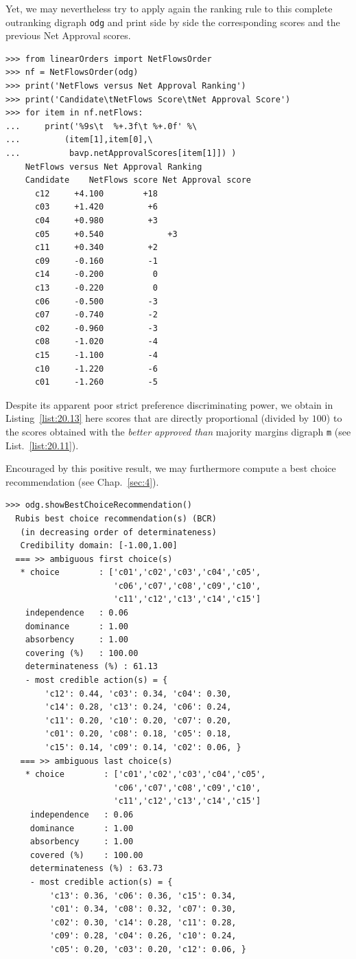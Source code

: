 Yet, we may nevertheless try to apply again the \NetFlows ranking rule to this complete outranking digraph \texttt{odg} and print side by side the corresponding \NetFlows scores and the previous Net Approval scores. 
\begin{lstlisting}[caption={Comparing the \NetFlows and the Net Approval rankings},label=list:20.13]
>>> from linearOrders import NetFlowsOrder
>>> nf = NetFlowsOrder(odg)
>>> print('NetFlows versus Net Approval Ranking')
>>> print('Candidate\tNetFlows Score\tNet Approval Score')
>>> for item in nf.netFlows:
...     print('%9s\t  %+.3f\t %+.0f' %\
...         (item[1],item[0],\
...          bavp.netApprovalScores[item[1]]) )  
    NetFlows versus Net Approval Ranking
    Candidate    NetFlows score	Net Approval score
      c12	  +4.100	    +18
      c03	  +1.420	     +6
      c04	  +0.980	     +3
      c05	  +0.540             +3
      c11	  +0.340	     +2
      c09	  -0.160	     -1
      c14	  -0.200	      0
      c13	  -0.220	      0
      c06	  -0.500	     -3
      c07	  -0.740	     -2
      c02	  -0.960	     -3
      c08	  -1.020	     -4
      c15	  -1.100	     -4
      c10	  -1.220	     -6
      c01	  -1.260	     -5
\end{lstlisting}

Despite its apparent poor strict preference discriminating power, we obtain in Listing~\vref{list:20.13} here \NetFlows scores that are directly proportional (divided by $100$) to the scores obtained with the \emph{better approved than} majority margins digraph \texttt{m} (see List.~\vref{list:20.11}).

Encouraged by this positive result, we may furthermore compute a \Rubis best choice recommendation (see Chap.~\ref{sec:4}).
\begin{lstlisting}[caption={Computing a best social choice recommendation},label=list:20.14]
>>> odg.showBestChoiceRecommendation()
  Rubis best choice recommendation(s) (BCR)
   (in decreasing order of determinateness)   
   Credibility domain: [-1.00,1.00]
  === >> ambiguous first choice(s) 
   * choice        : ['c01','c02','c03','c04','c05',
                      'c06','c07','c08','c09','c10',
                      'c11','c12','c13','c14','c15']
    independence   : 0.06
    dominance      : 1.00
    absorbency     : 1.00
    covering (%)   : 100.00
    determinateness (%) : 61.13
    - most credible action(s) = {
        'c12': 0.44, 'c03': 0.34, 'c04': 0.30,
        'c14': 0.28, 'c13': 0.24, 'c06': 0.24,
        'c11': 0.20, 'c10': 0.20, 'c07': 0.20,
        'c01': 0.20, 'c08': 0.18, 'c05': 0.18,
        'c15': 0.14, 'c09': 0.14, 'c02': 0.06, }
   === >> ambiguous last choice(s)
    * choice        : ['c01','c02','c03','c04','c05',
                      'c06','c07','c08','c09','c10',
                      'c11','c12','c13','c14','c15']
     independence   : 0.06
     dominance      : 1.00
     absorbency     : 1.00
     covered (%)    : 100.00
     determinateness (%) : 63.73
     - most credible action(s) = {
         'c13': 0.36, 'c06': 0.36, 'c15': 0.34,
         'c01': 0.34, 'c08': 0.32, 'c07': 0.30,
         'c02': 0.30, 'c14': 0.28, 'c11': 0.28,
         'c09': 0.28, 'c04': 0.26, 'c10': 0.24,
         'c05': 0.20, 'c03': 0.20, 'c12': 0.06, }
\end{lstlisting}

